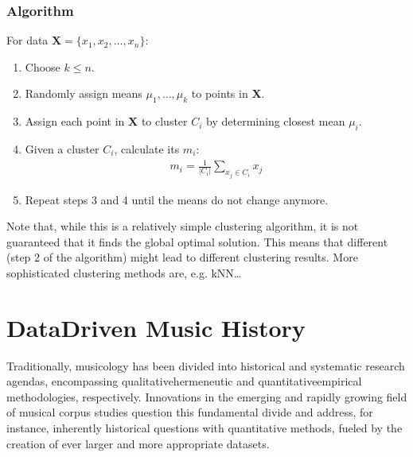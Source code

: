 \documentclass[letterpaper,10pt,english]{sphinxmanual}
\begin{document}
\subsection{Algorithm}
\label{\detokenize{billboard:algorithm}}
For data \(\mathbf{X}=\{x_1, x_2, \ldots, x_n\}\):
\begin{enumerate}
%
\item {} 
Choose \(k \leq n\).

\item {} 
Randomly assign means \(\mu_1, \ldots, \mu_k\) to points in \(\mathbf{X}\).

\item {} 
Assign each point in \(\mathbf{X}\) to cluster \(C_i\) by determining closest mean \(\mu_i\).

\item {} 
Given a cluster \(C_i\), calculate its  \(m_i\):
\begin{align*}
   m_i =\frac{1}{|C_i|}\sum_{x_j \in C_i} x_j
\end{align*}
\item {} 
Repeat steps 3 and 4 until the means do not change anymore.

\end{enumerate}

Note that, while this is a relatively simple clustering algorithm, it is not guaranteed that it
finds the global optimal solution. This means that different  (step 2 of the algorithm)
might lead to different clustering results. More sophisticated clustering methods are, e.g. kNN…


\chapter{Data\sphinxhyphen{}Driven Music History}
\label{\detokenize{data-driven_music_history:data-driven-music-history}}\label{\detokenize{data-driven_music_history::doc}}
Traditionally, musicology has been divided into historical and
systematic research agendas, encompassing qualitative\sphinxhyphen{}hermeneutic and
quantitative\sphinxhyphen{}empirical methodologies, respectively. Innovations in the
emerging and rapidly growing field of musical corpus studies question
this fundamental divide and address, for instance, inherently historical
questions with quantitative methods, fueled by the creation of ever
larger and more appropriate datasets.
\end{document}
